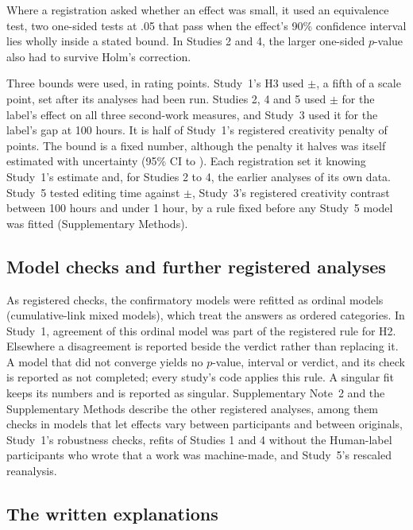 Where a registration asked whether an effect was small, it used an equivalence test, two one-sided tests at .05 that pass when the effect's 90\% confidence interval lies wholly inside a stated bound.\cite{schuirmann1987comparison,lakens2017equivalence} In Studies 2 and 4, the larger one-sided $p$-value also had to survive Holm's correction.

Three bounds were used, in rating points. Study~1's H3 used $\pm$\SOneHThreeBound, a fifth of a scale point, set after its analyses had been run. Studies 2, 4 and 5 used $\pm$\SourceBound{} for the label's effect on all three second-work measures, and Study~3 used it for the label's gap at 100 hours. It is half of Study~1's registered creativity penalty of \SOneHOneCreatDiffPrecise{} points. The bound is a fixed number, although the penalty it halves was itself estimated with uncertainty (95\% CI \SOneHOneCreatLo{} to \SOneHOneCreatHi). Each registration set it knowing Study~1's estimate and, for Studies 2 to 4, the earlier analyses of its own data. Study~5 tested editing time against $\pm$\SFiveEditTimeBound, Study~3's registered creativity contrast between 100 hours and under 1 hour, by a rule fixed before any Study~5 model was fitted (Supplementary Methods).

\subsection*{Model checks and further registered analyses}

As registered checks, the confirmatory models were refitted as ordinal models (cumulative-link mixed models), which treat the answers as ordered categories. In Study~1, agreement of this ordinal model was part of the registered rule for H2. Elsewhere a disagreement is reported beside the verdict rather than replacing it. A model that did not converge yields no $p$-value, interval or verdict, and its check is reported as not completed; every study's code applies this rule. A singular fit keeps its numbers and is reported as singular. Supplementary Note~2 and the Supplementary Methods describe the other registered analyses, among them checks in models that let effects vary between participants and between originals, Study~1's robustness checks, refits of Studies 1 and 4 without the Human-label participants who wrote that a work was machine-made, and Study~5's rescaled reanalysis.

\subsection*{The written explanations}

